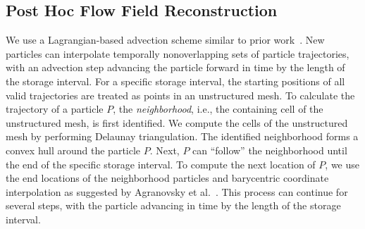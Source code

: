 \subsection{Post Hoc Flow Field Reconstruction}
\label{sec:posthoc}
We use a Lagrangian-based advection scheme similar to prior work~\cite{agranovsky2014improved, sane2018revisiting, sane2019interpolation}.
%
New particles can interpolate temporally nonoverlapping sets of particle trajectories, with an advection step advancing the particle forward in time by the length of the storage interval.
%
%
%
%
For a specific storage interval, the starting positions of all valid trajectories are treated as points in an unstructured mesh.
%
To calculate the trajectory of a particle $P$, the \textit{neighborhood}, i.e., the containing cell of the unstructured mesh, is first identified.
%
We compute the cells of the unstructured mesh by performing Delaunay triangulation.
%
%
%
%
%
%
The identified neighborhood forms a convex hull around the particle $P$.
%
Next, $P$ can ``follow'' the neighborhood until the end of the specific storage interval.
%
To compute the next location of $P$, we use the end locations of the neighborhood particles and barycentric coordinate interpolation as suggested by Agranovsky et al.~\cite{agranovsky2015subsampling}.
%
This process can continue for several steps, with the particle advancing in time by the length of the storage interval.
%

%
